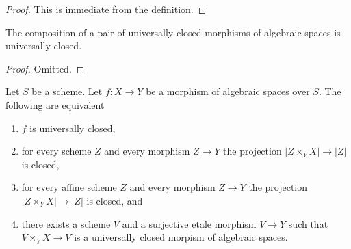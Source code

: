 \begin{proof}
This is immediate from the definition.
\end{proof}

\begin{lemma}
\label{lemma-composition-universally-closed}
The composition of a pair of universally closed morphisms of algebraic spaces
is universally closed.
\end{lemma}

\begin{proof}
Omitted.
\end{proof}

\begin{lemma}
\label{lemma-characterize-universally-closed}
Let $S$ be a scheme. Let $f : X \to Y$ be a morphism of algebraic spaces
over $S$. The following are equivalent
\begin{enumerate}
\item $f$ is universally closed,
\item for every scheme $Z$ and every morphism $Z \to Y$
the projection $|Z \times_Y X| \to |Z|$ is closed,
\item for every affine scheme $Z$ and every morphism $Z \to Y$
the projection $|Z \times_Y X| \to |Z|$ is closed, and
\item there exists a scheme $V$ and a surjective etale morphism
$V \to Y$ such that $V \times_Y X \to V$ is a universally closed morpism
of algebraic spaces.
\end{enumerate}
\end{lemma}

